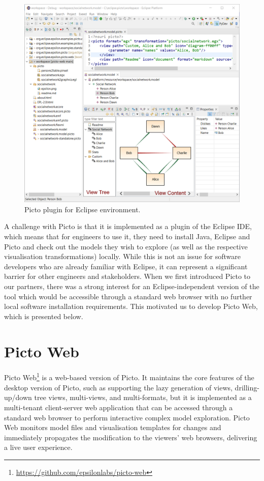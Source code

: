\documentclass[sigconf,review]{acmart}
\begin{document}
\begin{figure}[h]
  \centering
  \includegraphics[width=\linewidth]{images/picto-eclipse.png}
  \caption{Picto plugin for Eclipse environment.}
  \label{fig:picto-eclipse}
\end{figure}

A challenge with Picto is that it is implemented as a plugin of the Eclipse IDE, which means that for engineers to use it, they need to install Java, Eclipse and Picto and check out the models they wish to explore (as well as the respective visualisation transformations) locally. While this is not an issue for software developers who are already familiar with Eclipse, it can represent a significant barrier for other engineers and stakeholders. When we first introduced Picto to our partners, there was a strong interest for an Eclipse-independent version of the tool which would be accessible through a standard web browser with no further local software installation requirements. This motivated us to develop Picto Web, which is presented below.

\section{Picto Web}

Picto Web\footnote{\url{https://github.com/epsilonlabs/picto-web}} is a web-based version of Picto. 
It maintains the core features of the desktop version of Picto, such as supporting the lazy generation of views, drilling-up/down tree views, multi-views, and multi-formats, but it is implemented as a multi-tenant client-server web application that can be accessed through a standard web browser to perform interactive complex model exploration. 
Picto Web monitors model files and visualisation templates for changes and immediately propagates the modification to the viewers' web browsers, delivering a live user experience.
\end{document}
